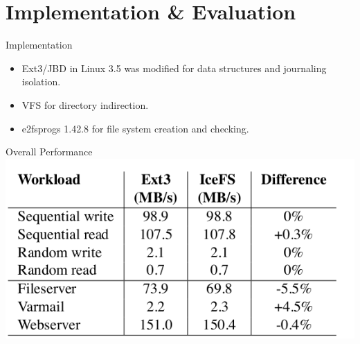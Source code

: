 \documentclass[aspectratio=169]{beamer}
\newcommand{\bi}{\begin{itemize}}
\newcommand{\ei}{\end{itemize}}
\begin{document}
\section{Implementation \& Evaluation}
\begin{frame}{Implementation}
    \bi
\item Ext3/JBD in Linux 3.5 was modified for data structures and journaling
    isolation.
\item VFS for directory indirection.
\item e2fsprogs 1.42.8 for file system creation and checking.
    \ei
\end{frame}

\begin{frame}{Overall Performance}
    \includegraphics[scale=0.6]{./figures/table3.png}
\end{frame}
\end{document}
